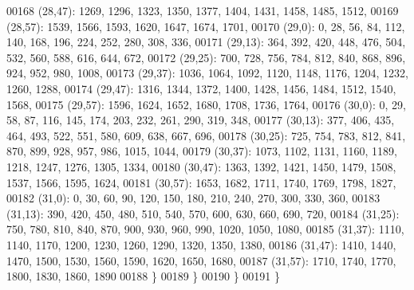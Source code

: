 \begin{DoxyCode}
00168       (28,47): 1269, 1296, 1323, 1350, 1377, 1404, 1431, 1458, 1485, 1512,
00169       (28,57): 1539, 1566, 1593, 1620, 1647, 1674, 1701,
00170       (29,0): 0, 28, 56, 84, 112, 140, 168, 196, 224, 252, 280, 308, 336,
00171       (29,13): 364, 392, 420, 448, 476, 504, 532, 560, 588, 616, 644, 672,
00172       (29,25): 700, 728, 756, 784, 812, 840, 868, 896, 924, 952, 980, 1008,
00173       (29,37): 1036, 1064, 1092, 1120, 1148, 1176, 1204, 1232, 1260, 1288,
00174       (29,47): 1316, 1344, 1372, 1400, 1428, 1456, 1484, 1512, 1540, 1568,
00175       (29,57): 1596, 1624, 1652, 1680, 1708, 1736, 1764,
00176       (30,0): 0, 29, 58, 87, 116, 145, 174, 203, 232, 261, 290, 319, 348,
00177       (30,13): 377, 406, 435, 464, 493, 522, 551, 580, 609, 638, 667, 696,
00178       (30,25): 725, 754, 783, 812, 841, 870, 899, 928, 957, 986, 1015, 1044,
00179       (30,37): 1073, 1102, 1131, 1160, 1189, 1218, 1247, 1276, 1305, 1334,
00180       (30,47): 1363, 1392, 1421, 1450, 1479, 1508, 1537, 1566, 1595, 1624,
00181       (30,57): 1653, 1682, 1711, 1740, 1769, 1798, 1827,
00182       (31,0): 0, 30, 60, 90, 120, 150, 180, 210, 240, 270, 300, 330, 360,
00183       (31,13): 390, 420, 450, 480, 510, 540, 570, 600, 630, 660, 690, 720,
00184       (31,25): 750, 780, 810, 840, 870, 900, 930, 960, 990, 1020, 1050, 1080,
00185       (31,37): 1110, 1140, 1170, 1200, 1230, 1260, 1290, 1320, 1350, 1380,
00186       (31,47): 1410, 1440, 1470, 1500, 1530, 1560, 1590, 1620, 1650, 1680,
00187       (31,57): 1710, 1740, 1770, 1800, 1830, 1860, 1890
00188       \}
00189    \}
00190 \}
00191 \}
\end{DoxyCode}
